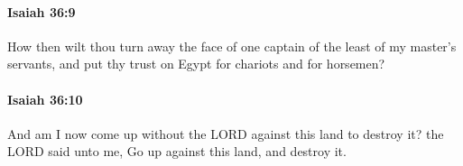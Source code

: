		\paragraph{Isaiah 36:9} %
			\label{ISAIAH-36-9}

			How then wilt thou turn away the face of one captain of the least of my master's servants, and put thy trust on Egypt for chariots and for horsemen?


		\paragraph{Isaiah 36:10} %
			\label{ISAIAH-36-10}

			And am I now come up without the LORD against this land to destroy it? the LORD said unto me, Go up against this land, and destroy it.


